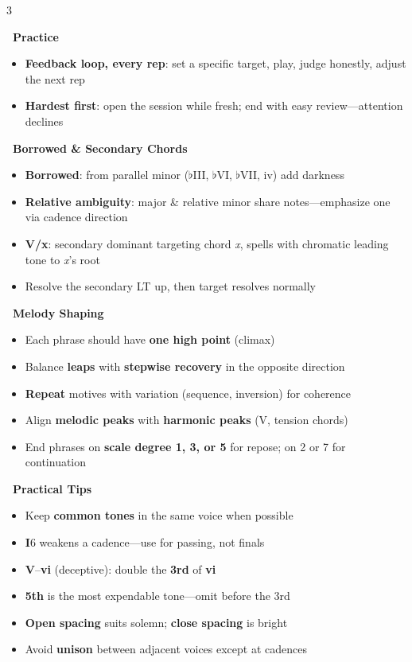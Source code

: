 \documentclass[letterpaper]{article}
\newcommand{\rn}[2]{\textbf{#1}#2}
\newcommand{\sect}[2]{%
  \noindent\begin{minipage}{\linewidth}%
  \colorbox{headerbg}{\color{white}\textbf{\ #1\ }}\par
  \vspace{1mm}
  #2
  \end{minipage}\par\vspace{2.5mm}%
}
\begin{document}
\begin{multicols}{3}
\sect{Practice}{%
\begin{itemize}
  \item \textbf{Feedback loop, every rep}: set a specific target, play, judge honestly, adjust the next rep
  \item \textbf{Hardest first}: open the session while fresh; end with easy review---attention declines
\end{itemize}%
}

\sect{Borrowed \& Secondary Chords}{%
\begin{itemize}
  \item \textbf{Borrowed}: from parallel minor (\(\flat\)III, \(\flat\)VI, \(\flat\)VII, iv) add darkness
  \item \textbf{Relative ambiguity}: major \& relative minor share notes---emphasize one via cadence direction
  \item \textbf{V/x}: secondary dominant targeting chord \textit{x}, spells with chromatic leading tone to \textit{x}'s root
  \item Resolve the secondary LT up, then target resolves normally
\end{itemize}%
}

\sect{Melody Shaping}{%
\begin{itemize}
  \item Each phrase should have \textbf{one high point} (climax)
  \item Balance \textbf{leaps} with \textbf{stepwise recovery} in the opposite direction
  \item \textbf{Repeat} motives with variation (sequence, inversion) for coherence
  \item Align \textbf{melodic peaks} with \textbf{harmonic peaks} (V, tension chords)
  \item End phrases on \textbf{scale degree 1, 3, or 5} for repose; on 2 or 7 for continuation
\end{itemize}%
}

\sect{Practical Tips}{%
\begin{itemize}
  \item Keep \textbf{common tones} in the same voice when possible
  \item \rn{I}{6} weakens a cadence---use for passing, not finals
  \item \rn{V}{}--\rn{vi}{} (deceptive): double the \textbf{3rd} of \rn{vi}{}
  \item \textbf{5th} is the most expendable tone---omit before the 3rd
  \item \textbf{Open spacing} suits solemn; \textbf{close spacing} is bright
  \item Avoid \textbf{unison} between adjacent voices except at cadences
\end{itemize}%
}


\end{multicols}
\end{document}
